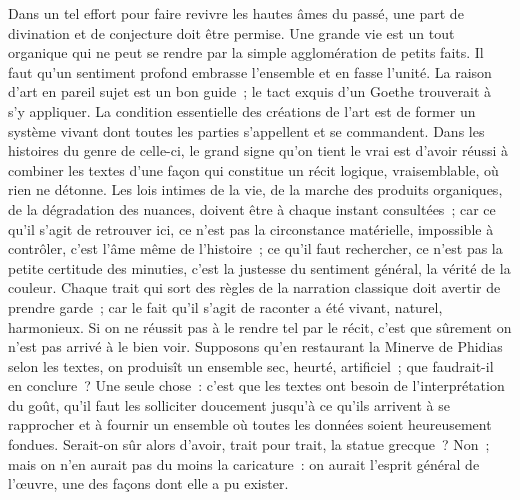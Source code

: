 \documentclass[french,twoside]{book} %
\begin{document}
Dans un tel effort pour faire revivre les hautes âmes du passé, une part de divination et de conjecture doit être permise. Une grande vie est un tout organique qui ne peut se rendre par la simple agglomération de petits faits. Il faut qu’un sentiment profond embrasse l’ensemble et en fasse l’unité. La raison d’art en pareil sujet est un bon guide ; le tact exquis d’un Goethe trouverait à s’y appliquer. La condition essentielle des créations de l’art est de former un système vivant dont toutes les parties s’appellent et se commandent. Dans les histoires du genre de celle-ci, le grand signe qu’on tient le vrai est d’avoir réussi à combiner les textes d’une façon qui constitue un récit logique, vraisemblable, où rien ne détonne. Les lois intimes de la vie, de la marche des produits organiques, de la dégradation des nuances, doivent être à chaque instant consultées ; car ce qu’il s’agit de retrouver ici, ce n’est pas la circonstance matérielle, impossible à contrôler, c’est l’âme même de l’histoire ; ce qu’il faut rechercher, ce n’est pas la petite certitude des minuties, c’est la justesse du sentiment général, la vérité de la couleur. Chaque trait qui sort des règles de la narration classique doit avertir de prendre garde ; car le fait qu’il s’agit de raconter a été vivant, naturel, harmonieux. Si on ne réussit pas à le rendre tel par le récit, c’est que sûrement on n’est pas arrivé à le bien voir. Supposons qu’en restaurant la Minerve de Phidias selon les textes, on produisît un ensemble sec, heurté, artificiel ; que faudrait-il en conclure ? Une seule chose : c’est que les textes ont besoin de l’interprétation du goût, qu’il faut les solliciter doucement jusqu’à ce qu’ils arrivent à se rapprocher et à fournir un ensemble où toutes les données soient heureusement fondues. Serait-on sûr alors d’avoir, trait pour trait, la statue grecque ? Non ; mais on n’en aurait pas du moins la caricature : on aurait l’esprit général de l’œuvre, une des façons dont elle a pu exister.\par
\end{document}
